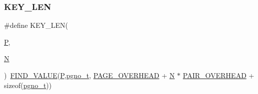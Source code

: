 \mbox{\label{adat-devel_2other__libs_2filedb_2filehash_2ffdb__page_8h_ac2adfc4a9b947bdf68b74e2fa883c7f3}} 
\subsubsection{\texorpdfstring{KEY\_LEN}{KEY\_LEN}}
{\footnotesize\ttfamily \#define K\+E\+Y\+\_\+\+L\+EN(\begin{DoxyParamCaption}\item[{}]{\mbox{\hyperlink{adat__devel_2lib_2hadron_2operator__name__util_8cc_aef94be98e2c9e4a4dece75f60ca9792c}{P}},  }\item[{}]{\mbox{\hyperlink{adat__devel_2lib_2hadron_2operator__name__util_8cc_a7722c8ecbb62d99aee7ce68b1752f337}{N}} }\end{DoxyParamCaption})~\mbox{\hyperlink{adat__devel_2other__libs_2filedb_2filehash_2ffdb__page_8h_aac067124fe4d81f5306f4e2131e1121e}{F\+I\+N\+D\+\_\+\+V\+A\+L\+UE}}(\mbox{\hyperlink{adat__devel_2lib_2hadron_2operator__name__util_8cc_aef94be98e2c9e4a4dece75f60ca9792c}{P}},\mbox{\hyperlink{adat-devel_2other__libs_2filedb_2filehash_2ffdb__db_8h_a000813331643d38481142bcce7de1501}{pgno\+\_\+t}}, \mbox{\hyperlink{adat__devel_2other__libs_2filedb_2filehash_2ffdb__page_8h_a4be3c5b1517f8928d9819032d1ac4864}{P\+A\+G\+E\+\_\+\+O\+V\+E\+R\+H\+E\+AD}} + \mbox{\hyperlink{adat__devel_2lib_2hadron_2operator__name__util_8cc_a7722c8ecbb62d99aee7ce68b1752f337}{N}} $\ast$ \mbox{\hyperlink{adat__devel_2other__libs_2filedb_2filehash_2ffdb__page_8h_a1ac84ac56af664b2575aebd50f2c54bf}{P\+A\+I\+R\+\_\+\+O\+V\+E\+R\+H\+E\+AD}} + sizeof(\mbox{\hyperlink{adat-devel_2other__libs_2filedb_2filehash_2ffdb__db_8h_a000813331643d38481142bcce7de1501}{pgno\+\_\+t}}))}

\mbox{\label{adat-devel_2other__libs_2filedb_2filehash_2ffdb__page_8h_a2be5a2f1fdc94395dce82862134bf2b0}} 
